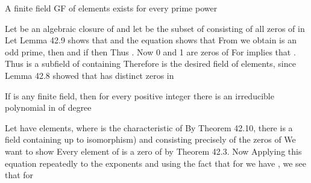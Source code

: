 \documentclass[11pt,oneside]{article}
\begin{document}
\begin{BookBody}
 A finite field GF of  elements exists for every prime power 

 Let  be an algebraic closure of  and let  be the subset of  consisting of all zeros of  in  Let  Lemma 42.9 shows that  and the equation  shows that  From  we obtain   is an odd prime, then  and if  then  Thus . Now 0 and 1 are zeros of  For \BookInline{\alpha }  implies that . Thus  is a subfield of  containing  Therefore is the desired field of  elements, since Lemma 42.8 showed that  has  distinct zeros in \BookEnd{\blacklozenge}

 If  is any finite field, then for every positive integer  there is an irreducible polynomial in  of degree 

 Let  have  elements, where  is the characteristic of  By Theorem 42.10, there is a field  containing up to isomorphism) and consisting precisely of the zeros of  We want to show  Every element of  is a zero of  by Theorem 42.3. Now  Applying this equation repeatedly to the exponents and using the fact that for  we have , we see that for 


\end{BookBody}
\end{document}
